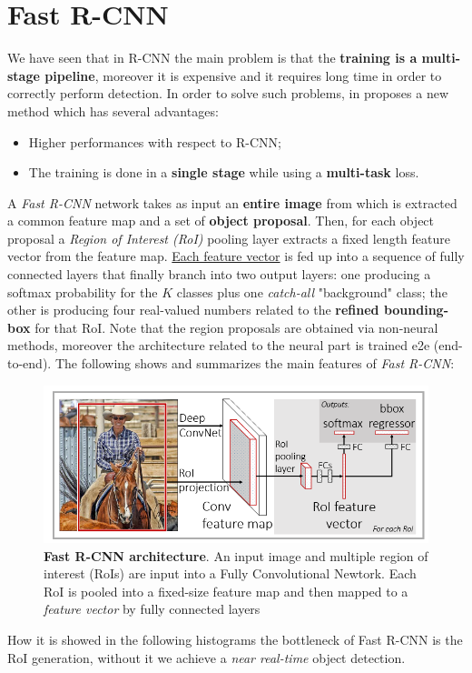 \section{Fast R-CNN}
We have seen that in R-CNN the main problem is that the \textbf{training is a multi-stage pipeline}, moreover it is expensive and it requires long time in order to correctly perform detection. In order to solve such problems, in \cite{DBLP:journals/corr/Girshick15} \citeauthor{DBLP:journals/corr/Girshick15} proposes a new method which has several advantages: 
\begin{itemize}
    \itemsep-0.3em 
    \item Higher performances with respect to R-CNN;
    \item The training is done in a \textbf{single stage} while using a \textbf{multi-task} loss.
\end{itemize}
A \textit{Fast R-CNN} network takes as input an \textbf{entire image} from which is extracted a common feature map and a set of \textbf{object proposal}. Then, for each object proposal a \textit{Region of Interest (RoI)} pooling layer extracts a fixed length feature vector from the feature map. \underline{Each feature vector} is fed up into a sequence of fully connected layers that finally branch into two output layers: one producing a softmax probability for the $K$ classes plus one \textit{catch-all} "background" class; the other is producing four real-valued numbers related to the \textbf{refined bounding-box} for that RoI. Note that the region proposals are obtained via non-neural methods, moreover the architecture related to the neural part is trained e2e (end-to-end).
The following shows and summarizes the main features of \textit{Fast R-CNN}:

\begin{figure}[h]
    \centering
    \includegraphics[scale=0.5]{img/FRCNN.png}
    \caption{\textbf{Fast R-CNN architecture}. An input image and multiple region of interest (RoIs) are input into a Fully Convolutional Newtork. Each RoI is pooled into a fixed-size feature map and then mapped to a \textit{feature vector} by fully connected layers} 
\end{figure}
How it is showed in the following histograms the bottleneck of Fast R-CNN is the RoI generation, without it we achieve a \textit{near real-time} object detection.


